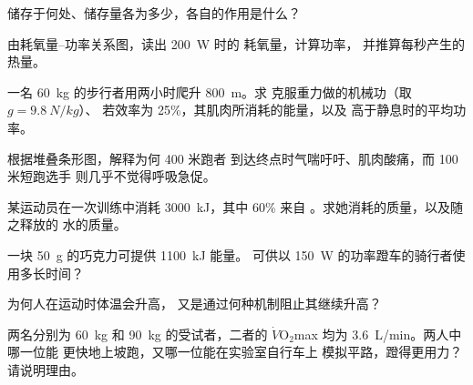 \begin{exercise}[$\star$]\label{exo:g10:exercise-and-energy:5}
储存于何处、储存量各为多少，各自的作用是什么？
\end{exercise}

\begin{exercise}[$\star\star$]\label{exo:g10:exercise-and-energy:6}
由耗氧量–功率关系图，读出 \qty{200}{W} 时的
耗氧量，计算功率，
并推算每秒产生的热量。
\end{exercise}

\begin{exercise}[$\star\star$]\label{exo:g10:exercise-and-energy:7}
一名 \qty{60}{kg} 的步行者用两小时爬升 \qty{800}{m}。求
克服重力做的机械功（取 $g = \qty{9.8}{N/kg}$）、
若效率为 25\%，其肌肉所消耗的能量，以及
高于静息时的平均功率。
\end{exercise}

\begin{exercise}[$\star\star$]\label{exo:g10:exercise-and-energy:8}
根据堆叠条形图，解释为何 400 米跑者
到达终点时气喘吁吁、肌肉酸痛，而 100 米短跑选手
则几乎不觉得呼吸急促。
\end{exercise}

\begin{exercise}[$\star\star$]\label{exo:g10:exercise-and-energy:9}
某运动员在一次训练中消耗 \qty{3000}{kJ}，其中 60\% 来自
。求她消耗的质量，以及随之释放的
水的质量。
\end{exercise}

\begin{exercise}[$\star\star$]\label{exo:g10:exercise-and-energy:10}
一块 \qty{50}{g} 的巧克力可提供 \qty{1100}{kJ} 能量。
可供以 \qty{150}{W} 的功率蹬车的骑行者使用多长时间？
\end{exercise}

\begin{exercise}[$\star\star$]\label{exo:g10:exercise-and-energy:11}
为何人在运动时体温会升高，
又是通过何种机制阻止其继续升高？
\end{exercise}

\begin{exercise}[$\star\star\star$]\label{exo:g10:exercise-and-energy:12}
两名分别为 \qty{60}{kg} 和 \qty{90}{kg} 的受试者，二者的
$\dot V\!\mathrm{O_2}$max 均为 \qty{3.6}{L/min}。两人中哪一位能
更快地上坡跑，又哪一位能在实验室自行车上
模拟平路，蹬得更用力？请说明理由。
\end{exercise}

